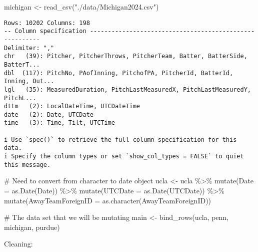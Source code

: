 \documentclass[
  letterpaper,
  DIV=11,
  numbers=noendperiod]{scrartcl}
\newenvironment{Shaded}{\begin{snugshade}}{\end{snugshade}}
\newcommand{\AttributeTok}[1]{\textcolor[rgb]{0.40,0.45,0.13}{#1}}
\newcommand{\CommentTok}[1]{\textcolor[rgb]{0.37,0.37,0.37}{#1}}
\newcommand{\FunctionTok}[1]{\textcolor[rgb]{0.28,0.35,0.67}{#1}}
\newcommand{\NormalTok}[1]{\textcolor[rgb]{0.00,0.23,0.31}{#1}}
\newcommand{\OtherTok}[1]{\textcolor[rgb]{0.00,0.23,0.31}{#1}}
\newcommand{\SpecialCharTok}[1]{\textcolor[rgb]{0.37,0.37,0.37}{#1}}
\newcommand{\StringTok}[1]{\textcolor[rgb]{0.13,0.47,0.30}{#1}}
\begin{document}
\begin{Shaded}
\begin{Highlighting}[]
\NormalTok{michigan }\OtherTok{\textless{}{-}} \FunctionTok{read\_csv}\NormalTok{(}\StringTok{"./data/Michigan2024.csv"}\NormalTok{)}
\end{Highlighting}
\end{Shaded}

\begin{verbatim}
Rows: 10202 Columns: 198
-- Column specification --------------------------------------------------------
Delimiter: ","
chr   (39): Pitcher, PitcherThrows, PitcherTeam, Batter, BatterSide, BatterT...
dbl  (117): PitchNo, PAofInning, PitchofPA, PitcherId, BatterId, Inning, Out...
lgl   (35): MeasuredDuration, PitchLastMeasuredX, PitchLastMeasuredY, PitchL...
dttm   (2): LocalDateTime, UTCDateTime
date   (2): Date, UTCDate
time   (3): Time, Tilt, UTCTime

i Use `spec()` to retrieve the full column specification for this data.
i Specify the column types or set `show_col_types = FALSE` to quiet this message.
\end{verbatim}

\begin{Shaded}
\begin{Highlighting}[]
\CommentTok{\# Need to convert from character to date object}
\NormalTok{ucla }\OtherTok{\textless{}{-}}\NormalTok{ ucla }\SpecialCharTok{\%\textgreater{}\%}
  \FunctionTok{mutate}\NormalTok{(}\AttributeTok{Date =} \FunctionTok{as.Date}\NormalTok{(Date)) }\SpecialCharTok{\%\textgreater{}\%}
  \FunctionTok{mutate}\NormalTok{(}\AttributeTok{UTCDate =} \FunctionTok{as.Date}\NormalTok{(UTCDate)) }\SpecialCharTok{\%\textgreater{}\%}
  \FunctionTok{mutate}\NormalTok{(}\AttributeTok{AwayTeamForeignID =} \FunctionTok{as.character}\NormalTok{(AwayTeamForeignID))}

\CommentTok{\# The data set that we will be mutating}
\NormalTok{main }\OtherTok{\textless{}{-}} \FunctionTok{bind\_rows}\NormalTok{(ucla, penn, michigan, purdue)}
\end{Highlighting}
\end{Shaded}

Cleaning:
\end{document}
